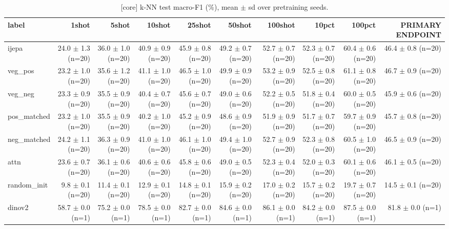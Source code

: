 \begin{table}[t]
\centering
\small
\caption{[core] k-NN test macro-F1 (\%), mean $\pm$ sd over pretraining seeds.}
\label{tab:main_results_knn}
\begin{tabular}{lrrrrrrrrr}
\toprule
label & 1shot & 5shot & 10shot & 25shot & 50shot & 100shot & 10pct & 100pct & PRIMARY ENDPOINT \\
\midrule
ijepa & 24.0 $\pm$ 1.3 (n=20) & 36.0 $\pm$ 1.0 (n=20) & 40.9 $\pm$ 0.9 (n=20) & 45.9 $\pm$ 0.8 (n=20) & 49.2 $\pm$ 0.7 (n=20) & 52.7 $\pm$ 0.7 (n=20) & 52.3 $\pm$ 0.7 (n=20) & 60.4 $\pm$ 0.6 (n=20) & 46.4 $\pm$ 0.8 (n=20) \\
veg\_pos & 23.2 $\pm$ 1.0 (n=20) & 35.6 $\pm$ 1.2 (n=20) & 41.1 $\pm$ 1.0 (n=20) & 46.5 $\pm$ 1.0 (n=20) & 49.9 $\pm$ 0.9 (n=20) & 53.2 $\pm$ 0.9 (n=20) & 52.5 $\pm$ 0.8 (n=20) & 61.1 $\pm$ 0.8 (n=20) & 46.7 $\pm$ 0.9 (n=20) \\
veg\_neg & 23.3 $\pm$ 0.9 (n=20) & 35.5 $\pm$ 0.9 (n=20) & 40.4 $\pm$ 0.7 (n=20) & 45.6 $\pm$ 0.7 (n=20) & 49.0 $\pm$ 0.6 (n=20) & 52.2 $\pm$ 0.5 (n=20) & 51.8 $\pm$ 0.4 (n=20) & 60.0 $\pm$ 0.5 (n=20) & 45.9 $\pm$ 0.6 (n=20) \\
pos\_matched & 23.2 $\pm$ 1.0 (n=20) & 35.5 $\pm$ 0.9 (n=20) & 40.2 $\pm$ 1.0 (n=20) & 45.2 $\pm$ 0.9 (n=20) & 48.6 $\pm$ 0.9 (n=20) & 51.9 $\pm$ 0.9 (n=20) & 51.7 $\pm$ 0.7 (n=20) & 59.7 $\pm$ 0.9 (n=20) & 45.7 $\pm$ 0.8 (n=20) \\
neg\_matched & 24.2 $\pm$ 1.1 (n=20) & 36.3 $\pm$ 0.9 (n=20) & 41.0 $\pm$ 1.0 (n=20) & 46.1 $\pm$ 1.0 (n=20) & 49.4 $\pm$ 1.0 (n=20) & 52.7 $\pm$ 0.9 (n=20) & 52.3 $\pm$ 0.8 (n=20) & 60.5 $\pm$ 1.0 (n=20) & 46.5 $\pm$ 0.9 (n=20) \\
attn & 23.6 $\pm$ 0.7 (n=20) & 36.1 $\pm$ 0.6 (n=20) & 40.6 $\pm$ 0.6 (n=20) & 45.8 $\pm$ 0.6 (n=20) & 49.0 $\pm$ 0.5 (n=20) & 52.3 $\pm$ 0.4 (n=20) & 52.0 $\pm$ 0.3 (n=20) & 60.1 $\pm$ 0.6 (n=20) & 46.1 $\pm$ 0.5 (n=20) \\
random\_init & 9.8 $\pm$ 0.1 (n=20) & 11.4 $\pm$ 0.1 (n=20) & 12.9 $\pm$ 0.1 (n=20) & 14.8 $\pm$ 0.1 (n=20) & 15.9 $\pm$ 0.2 (n=20) & 17.0 $\pm$ 0.2 (n=20) & 15.7 $\pm$ 0.2 (n=20) & 19.7 $\pm$ 0.7 (n=20) & 14.5 $\pm$ 0.1 (n=20) \\
dinov2 & 58.7 $\pm$ 0.0 (n=1) & 75.2 $\pm$ 0.0 (n=1) & 78.5 $\pm$ 0.0 (n=1) & 82.7 $\pm$ 0.0 (n=1) & 84.6 $\pm$ 0.0 (n=1) & 86.1 $\pm$ 0.0 (n=1) & 84.2 $\pm$ 0.0 (n=1) & 87.5 $\pm$ 0.0 (n=1) & 81.8 $\pm$ 0.0 (n=1) \\
\bottomrule
\end{tabular}
\end{table}
